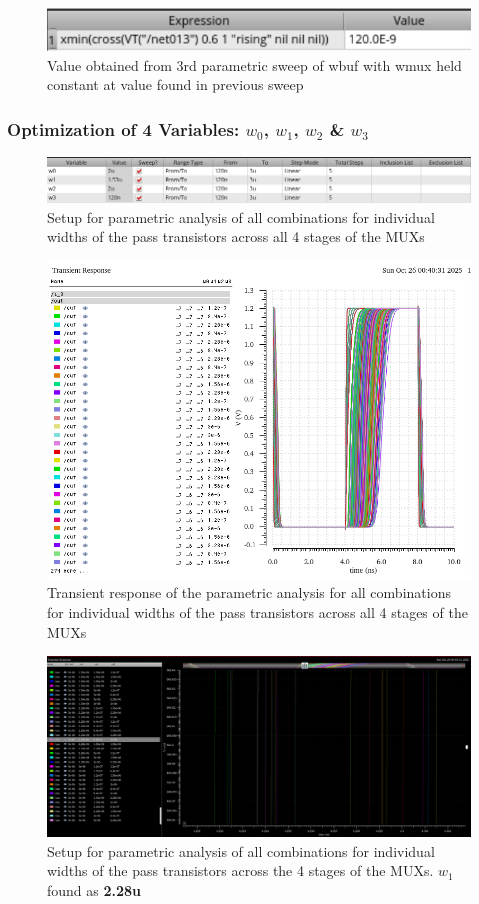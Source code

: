 \documentclass[12pt]{article}
\begin{document}
\begin{figure}[H]
    \centering
    \includegraphics[width=0.5\linewidth]{writeup//figures/wbuf4.png}
    \caption{Value obtained from 3rd parametric sweep of wbuf with wmux held constant at value found in previous sweep}
\end{figure}

\subsubsection*{Optimization of 4 Variables: $w_0$, $w_1$, $w_2$ \& $w_3$}

\begin{figure}[H]
    \centering
    \includegraphics[width=0.5\linewidth]{writeup//figures/wmux_all_parametric_sweep_setup.png}
    \caption{Setup for parametric analysis of all combinations for individual widths of the pass transistors across all 4 stages of the MUXs}
\end{figure}

\begin{figure}[H]
    \centering
    \includegraphics[width=0.5\linewidth]{writeup//figures/wmux_all_parametric_sweep.png}
    \caption{Transient response of the parametric analysis for all combinations for individual widths of the pass transistors across all 4 stages of the MUXs}
\end{figure}

\begin{figure}[H]
    \centering
    \includegraphics[width=\linewidth]{writeup//figures/wmux_all_zoomed_parametrics_weep2.png}
    \caption{Setup for parametric analysis of all combinations for individual widths of the pass transistors across the 4 stages of the MUXs. $w_1$ found as \textbf{2.28u}}
\end{figure}
\end{document}
